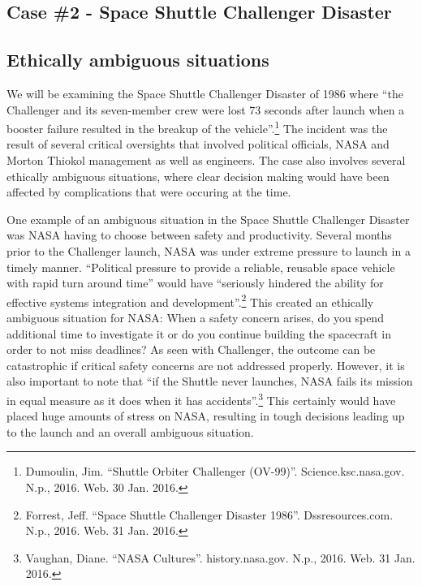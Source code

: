 \documentclass{article}
\newcommand{\q}[1]{``#1''}
\begin{document}
\begin{center}\section*{Case \#2 - Space Shuttle Challenger Disaster}\end{center}

\subsection{Ethically ambiguous situations}

We will be examining the Space Shuttle Challenger Disaster of 1986 where \q{the Challenger and its seven-member crew were lost 73 seconds after launch when a booster failure resulted in the breakup of the vehicle}.\footnote{Dumoulin, Jim. \q{Shuttle Orbiter Challenger (OV-99)}. Science.ksc.nasa.gov. N.p., 2016. Web. 30 Jan. 2016.} The incident was the result of several critical oversights that involved political officials, NASA and Morton Thiokol management as well as engineers. The case also involves several ethically ambiguous situations, where clear decision making would have been affected by complications that were occuring at the time. \par

One example of an ambiguous situation in the Space Shuttle Challenger Disaster was NASA having to choose between safety and productivity. Several months prior to the Challenger launch, NASA was under extreme pressure to launch in a timely manner. \q{Political pressure to provide a reliable, reusable space vehicle with rapid turn around time} would have \q{seriously hindered the ability for effective systems integration and development}.\footnote{Forrest, Jeff. \q{Space Shuttle Challenger Disaster 1986}. Dssresources.com. N.p., 2016. Web. 31 Jan. 2016.} This created an ethically ambiguous situation for NASA: When a safety concern arises, do you spend additional time to investigate it or do you continue building the spacecraft in order to not miss deadlines? As seen with Challenger, the outcome can be catastrophic if critical safety concerns are not addressed properly. However, it is also important to note that \q{if the Shuttle never launches, NASA fails its mission in equal measure as it does when it has accidents}.\footnote{Vaughan, Diane. \q{NASA Cultures}. history.nasa.gov. N.p., 2016. Web. 31 Jan. 2016.} This certainly would have placed huge amounts of stress on NASA, resulting in tough decisions leading up to the launch and an overall ambiguous situation. \par
\end{document}
